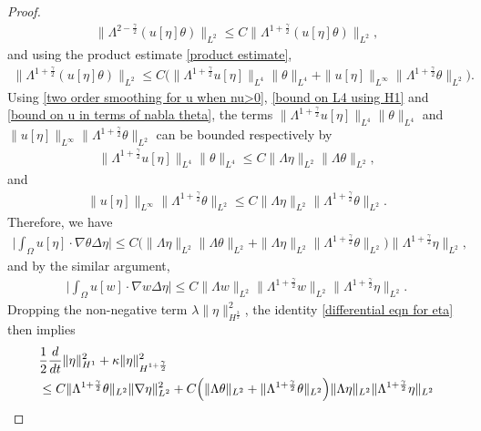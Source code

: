 \documentclass[reqno]{amsart}%
\theoremstyle{definition}
\theoremstyle{remark}
\numberwithin{equation}{section}
\newcommand{\1}{\mathbf{1}}
\newcommand{\intox}{\int_{\Omega}}
\numberwithin{equation}{section}
\numberwithin{theorem}{section}
\numberwithin{figure}{section}
\begin{document}
\begin{proof}
\begin{align*}
\|\Lambda^{2-\frac{\gamma}{2}}(u[\eta]\theta)\|_{L^2}\le C\|\Lambda^{1+\frac{\gamma}{2}}(u[\eta]\theta)\|_{L^2},
\end{align*}
and using the product estimate \eqref{product estimate}, 
\begin{align*}
\|\Lambda^{1+\frac{\gamma}{2}}(u[\eta]\theta)\|_{L^2}\le C\Big(\|\Lambda^{1+\frac{\gamma}{2}}u[\eta]\|_{L^4}\|\theta\|_{L^4}+\|u[\eta]\|_{L^\infty}\|\Lambda^{1+\frac{\gamma}{2}}\theta\|_{L^2}\Big).
\end{align*}
Using \eqref{two order smoothing for u when nu>0}, \eqref{bound on L4 using H1} and \eqref{bound on u in terms of nabla theta}, the terms $\|\Lambda^{1+\frac{\gamma}{2}}u[\eta]\|_{L^4}\|\theta\|_{L^4}$ and $\|u[\eta]\|_{L^\infty}\|\Lambda^{1+\frac{\gamma}{2}}\theta\|_{L^2}$ can be bounded respectively by 
\begin{align*}
\|\Lambda^{1+\frac{\gamma}{2}}u[\eta]\|_{L^4}\|\theta\|_{L^4}\le C\|\Lambda\eta\|_{L^2}\|\Lambda\theta\|_{L^2},
\end{align*}
and 
\begin{align*}
\|u[\eta]\|_{L^\infty}\|\Lambda^{1+\frac{\gamma}{2}}\theta\|_{L^2}\le C\|\Lambda \eta\|_{L^2}\|\Lambda^{1+\frac{\gamma}{2}}\theta\|_{L^2}.
\end{align*}
Therefore, we have
\begin{align*}
\Big|\intox u[\eta]\cdot\nabla\theta\Delta\eta\Big|\le C\Big(\|\Lambda\eta\|_{L^2}\|\Lambda\theta\|_{L^2}+\|\Lambda \eta\|_{L^2}\|\Lambda^{1+\frac{\gamma}{2}}\theta\|_{L^2}\Big)\|\Lambda^{1+\frac{\gamma}{2}}\eta\|_{L^2},
\end{align*} 
and by the similar argument,
\begin{align*}
\Big|\intox u[w]\cdot\nabla w\Delta\eta\Big|\le C\|\Lambda w\|_{L^2}\|\Lambda^{1+\frac{\gamma}{2}}w\|_{L^2}\|\Lambda^{1+\frac{\gamma}{2}}\eta\|_{L^2}.
\end{align*}
Dropping the non-negative term $\lambda\|\eta\|^2_{H^{\frac{3}{2}}}$, the identity \eqref{differential eqn for eta} then implies
\begin{align}\label{differential eqn for eta step 2}
&\frac{1}{2}\frac{d}{dt}\|\eta\|^2_{H^1}+\kappa\|\eta\|^2_{H^{1+\frac{\gamma}{2}}}\notag\\
&\le C\|\Lambda^{1+\frac{\gamma}{2}}\theta\|_{L^2}\|\nabla\eta\|^2_{L^2}+C\Big(\|\Lambda\theta\|_{L^2}+\|\Lambda^{1+\frac{\gamma}{2}}\theta\|_{L^2}\Big)\|\Lambda \eta\|_{L^2}\|\Lambda^{1+\frac{\gamma}{2}}\eta\|_{L^2}\notag\\

\end{align}
\end{proof}
\end{document}
